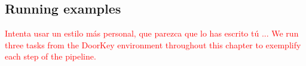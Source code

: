 \documentclass[11pt,english,listoffigures,listoftables]{tfgetsinf}
\begin{document}

\subsection{Running examples}
\label{sec:running-examples}

\textcolor{red}{Intenta usar un estilo más personal, que parezca que lo has escrito tú ...  We run three tasks from the DoorKey environment throughout this chapter to exemplify each step of the pipeline.}
\end{document}
